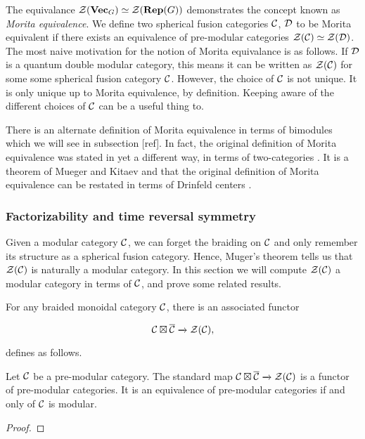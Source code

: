 The equivalance ${\mathcal Z}({\bf Vec}_G)\simeq {\mathcal Z}({\bf Rep}(G))$ demonstrates the concept known as {\em Morita equivalence}. We define two spherical fusion categories ${\mathcal C}$, ${\mathcal D}$ to be Morita equivalent if there exists an equivalence of pre-modular categories ${\mathcal Z}({\mathcal C})\simeq {\mathcal Z}({\mathcal D})$. The most naive motivation for the notion of Morita equivalance is as follows. If ${\mathcal D}$ is a quantum double modular category, this means it can be written as ${\mathcal Z}({\mathcal C})$ for some some spherical fusion category ${\mathcal C}$. However, the choice of ${\mathcal C}$ is not unique. It is only unique up to Morita equivalence, by definition. Keeping aware of the different choices of ${\mathcal C}$ can be a useful thing to.

\begin{rem}
There is an alternate definition of Morita equivalence in terms of bimodules which we will see in subsection [ref]. In fact, the original definition of Morita equivalence was stated in yet a different way, in terms of two-categories \cite{muger2001subfactorsA}. It is a theorem of Mueger and Kitaev and that the original definition of Morita equivalence can be restated in terms of Drinfeld centers \cite{etingof2011weakly}.
\end{rem}

\subsubsection{Factorizability and time reversal symmetry}

Given a modular category ${\mathcal C}$, we can forget the braiding on ${\mathcal C}$ and only remember its structure as a spherical fusion category. Hence, Muger's theorem tells us that ${\mathcal Z}({\mathcal C})$ is naturally a modular category. In this section we will compute ${\mathcal Z}({\mathcal C})$ a modular category in terms of ${\mathcal C}$, and prove some related results.

\begin{defn}
\end{defn} 

\begin{rem} For any braided monoidal category ${\mathcal C}$, there is an associated functor

$${\mathcal C}\boxtimes \overline{{\mathcal C}}\xrightarrow{} {\mathcal Z}({\mathcal C}),$$

defines as follows.
\end{rem}

\begin{thrm}\label{factorizability-theorem} Let ${\mathcal C}$ be a pre-modular category. The standard map ${\mathcal C}\boxtimes \overline{{\mathcal C}}\xrightarrow{}{\mathcal Z}({\mathcal C})$ is a functor of pre-modular categories. It is an equivalence of pre-modular categories if and only of ${\mathcal C}$ is modular.
\end{thrm}
\begin{proof}
\end{proof}

